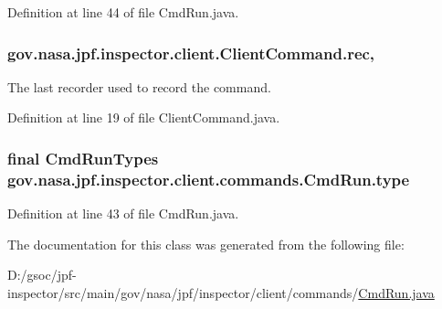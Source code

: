 Definition at line 44 of file Cmd\+Run.\+java.

\subsubsection[{\texorpdfstring{rec}{rec}}]{ gov.\+nasa.\+jpf.\+inspector.\+client.\+Client\+Command.\+rec\hspace{0.3cm}{\ttfamily [protected]}, {\ttfamily [inherited]}}\hypertarget{classgov_1_1nasa_1_1jpf_1_1inspector_1_1client_1_1_client_command_af4246f2427035c72a6af45a2c61361f7}{}\label{classgov_1_1nasa_1_1jpf_1_1inspector_1_1client_1_1_client_command_af4246f2427035c72a6af45a2c61361f7}


The last recorder used to record the command. 



Definition at line 19 of file Client\+Command.\+java.

\subsubsection[{\texorpdfstring{type}{type}}]{\setlength{\rightskip}{0pt plus 5cm}final {\bf Cmd\+Run\+Types} gov.\+nasa.\+jpf.\+inspector.\+client.\+commands.\+Cmd\+Run.\+type\hspace{0.3cm}{\ttfamily [private]}}\hypertarget{classgov_1_1nasa_1_1jpf_1_1inspector_1_1client_1_1commands_1_1_cmd_run_ab15ead52f55e938e9d4b682e1ecbdf0e}{}\label{classgov_1_1nasa_1_1jpf_1_1inspector_1_1client_1_1commands_1_1_cmd_run_ab15ead52f55e938e9d4b682e1ecbdf0e}


Definition at line 43 of file Cmd\+Run.\+java.



The documentation for this class was generated from the following file\+:\begin{DoxyCompactItemize}
\item 
D\+:/gsoc/jpf-\/inspector/src/main/gov/nasa/jpf/inspector/client/commands/\hyperlink{_cmd_run_8java}{Cmd\+Run.\+java}\end{DoxyCompactItemize}
